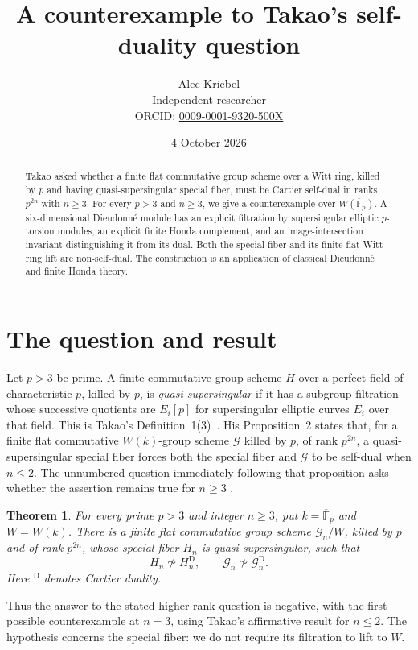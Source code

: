 \documentclass[10pt]{article}
\title{A counterexample to Takao's self-duality question}
\author{Alec Kriebel\\Independent researcher\\
\small ORCID: \href{https://orcid.org/0009-0001-9320-500X}{0009-0001-9320-500X}}
\date{4 October 2026}
\newtheorem{theorem}{Theorem}
\newcommand{\dual}{\mathrm D}
\begin{document}
\maketitle
\begin{abstract}
Takao asked whether a finite flat commutative group scheme over a Witt
ring, killed by $p$ and having quasi-supersingular special fiber, must be
Cartier self-dual in ranks $p^{2n}$ with $n\geq3$. For every $p>3$ and
$n\geq3$, we give a counterexample over $W(\overline{\mathbb F}_p)$.
A six-dimensional Dieudonn\'e module has an explicit filtration by
supersingular elliptic $p$-torsion modules, an explicit finite Honda
complement, and an image-intersection invariant distinguishing it from
its dual. Both the special fiber and its finite flat Witt-ring lift
are non-self-dual. The construction is an application of classical
Dieudonn\'e and finite Honda theory.
\end{abstract}

\section{The question and result}
Let $p>3$ be prime. A finite commutative group scheme $H$ over a perfect
field of characteristic $p$, killed by $p$, is \emph{quasi-supersingular}
if it has a subgroup filtration whose successive quotients are
$E_i[p]$ for supersingular elliptic curves $E_i$ over that field.
This is Takao's Definition~1(3)~\cite{Takao}. His Proposition~2 states
that, for a finite flat commutative $W(k)$-group scheme $\mathcal G$
killed by $p$, of rank $p^{2n}$, a quasi-supersingular special fiber
forces both the special fiber and $\mathcal G$ to be self-dual when
$n\leq2$. The unnumbered question immediately following that proposition
asks whether the assertion remains true for $n\geq3$
\cite[p.~2479]{Takao}.

\begin{theorem}\label{thm:main}
For every prime $p>3$ and integer $n\geq3$, put
$k=\overline{\mathbb F}_p$ and $W=W(k)$.
There is a finite flat commutative group scheme $\mathcal G_n/W$,
killed by $p$ and of rank $p^{2n}$, whose special fiber $H_n$ is
quasi-supersingular, such that
\[
 H_n\not\simeq H_n^{\dual},\qquad
 \mathcal G_n\not\simeq\mathcal G_n^{\dual}.
\]
Here ${}^{\dual}$ denotes Cartier duality.
\end{theorem}

Thus the answer to the stated higher-rank question is negative, with
the first possible counterexample at $n=3$, using Takao's affirmative
result for $n\leq2$. The hypothesis concerns the special fiber: we do
not require its filtration to lift to $W$.
\end{document}

